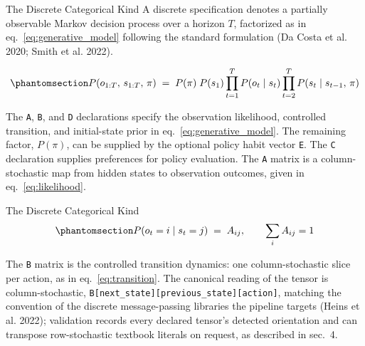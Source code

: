 \documentclass[
  ignorenonframetext,
]{beamer}
\begin{document}
\begin{frame}{The Discrete Categorical Kind}
\protect{}\label{the-discrete-categorical-kind}
A discrete specification denotes a partially observable Markov decision
process over a horizon \(T\), factorized as in
eq.~\ref{eq:generative_model} following the standard formulation (Da
Costa et al. 2020; Smith et al. 2022).

\begin{equation}\protect\phantomsection\label{eq:generative_model}{P(o_{1:T},\, s_{1:T},\, \pi) \;=\; P(\pi)\; P(s_1) \prod_{t=1}^{T} P(o_t \mid s_t) \prod_{t=2}^{T} P(s_t \mid s_{t-1},\, \pi)}\end{equation}

The \texttt{A}, \texttt{B}, and \texttt{D} declarations specify the
observation likelihood, controlled transition, and initial-state prior
in eq.~\ref{eq:generative_model}. The remaining factor, \(P(\pi)\), can
be supplied by the optional policy habit vector \texttt{E}. The
\texttt{C} declaration supplies preferences for policy evaluation. The
\texttt{A} matrix is a column-stochastic map from hidden states to
observation outcomes, given in eq.~\ref{eq:likelihood}.

\end{frame}

\begin{frame}{The Discrete Categorical Kind}
\begin{equation}\protect\phantomsection\label{eq:likelihood}{P(o_t = i \mid s_t = j) \;=\; A_{ij}, \qquad \sum_i A_{ij} = 1}\end{equation}

The \texttt{B} matrix is the controlled transition dynamics: one
column-stochastic slice per action, as in eq.~\ref{eq:transition}. The
canonical reading of the tensor is column-stochastic,
\texttt{B{[}next\_state{]}{[}previous\_state{]}{[}action{]}}, matching
the convention of the discrete message-passing libraries the pipeline
targets (Heins et al. 2022); validation records every declared tensor's
detected orientation and can transpose row-stochastic textbook literals
on request, as described in sec.~4.

\end{frame}
\end{document}
